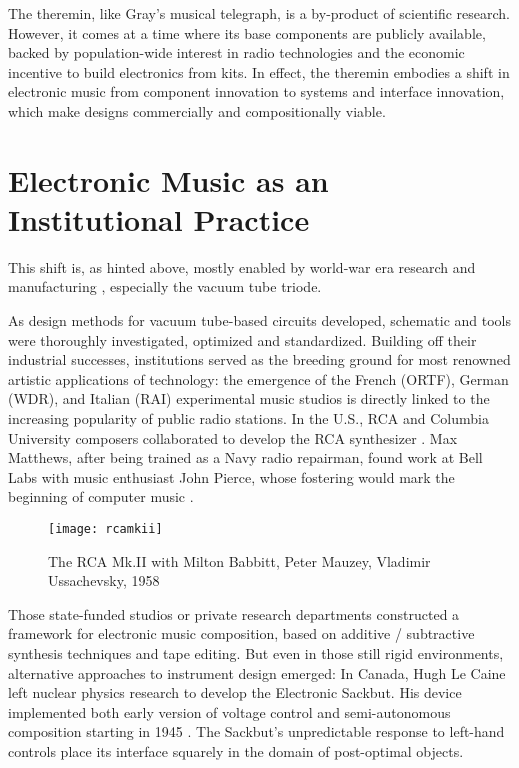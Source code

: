 \citep[p.33]{kock1978}

The theremin, like Gray's musical telegraph, is a by-product of scientific research. However, it comes at a time where its base components are publicly available, backed by population-wide interest in radio technologies and the economic incentive to build electronics from kits. In effect, the theremin embodies a shift in electronic music from component innovation to systems and interface innovation, which make designs commercially and compositionally viable. 

\section{Electronic Music as an Institutional Practice}

This shift is, as hinted above, mostly enabled by world-war era research and manufacturing \citep[p.81]{holmes2002}, especially the vacuum tube triode. 

As design methods for vacuum tube-based circuits developed, schematic and tools were thoroughly investigated, optimized and standardized. Building off their industrial successes, institutions served as the breeding ground for most renowned artistic applications of technology: the emergence of the French (ORTF), German (WDR), and Italian (RAI) experimental music studios is directly linked to the increasing popularity of public radio stations. In the U.S., RCA and Columbia University composers collaborated to develop the RCA synthesizer \citep{holmes2002}. Max Matthews, after being trained as a Navy radio repairman, found work at Bell Labs with music enthusiast John Pierce, whose fostering would mark the beginning of computer music \citep{park2009}.

	\begin{figure}[H]
	  \centering
	    \texttt{[image: rcamkii]}
	     \caption{The RCA Mk.II with Milton Babbitt, Peter Mauzey, Vladimir Ussachevsky, 1958}
	\end{figure}  
	
Those state-funded studios or private research departments constructed a framework for electronic music composition, based on additive / subtractive synthesis techniques and tape editing. But even in those still rigid environments, alternative approaches to instrument design emerged:  In Canada, Hugh Le Caine left nuclear physics research to develop the Electronic Sackbut. His device implemented both early version of voltage control and semi-autonomous composition starting in 1945 \citep{holmes2002}. The Sackbut's unpredictable response to left-hand controls place its interface squarely in the domain of post-optimal objects. 

